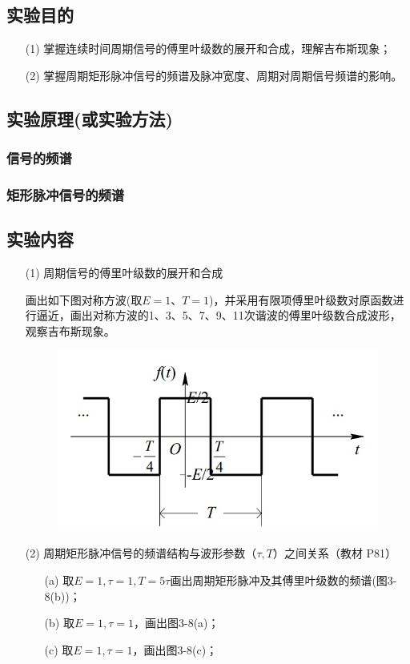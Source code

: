 \documentclass{article}
\begin{document}
	\subsection{{\heiti{}实验目的}}
	\begin{enumerate}
		\item [(1)] 掌握连续时间周期信号的傅里叶级数的展开和合成，理解吉布斯现象；
		\item [(2)] 掌握周期矩形脉冲信号的频谱及脉冲宽度、周期对周期信号频谱的影响。
	\end{enumerate}
	\subsection{{\heiti{}实验原理(或实验方法)}}
	\subsubsection{信号的频谱}
	\subsubsection{矩形脉冲信号的频谱}
	\subsection{{\heiti{}实验内容}}
	\begin{enumerate}
		\item[(1)] 周期信号的傅里叶级数的展开和合成
		
		画出如下图对称方波(取$E=1\text{、}T=1$)，并采用有限项傅里叶级数对原函数进行逼近，画出对称方波的1、3、5、7、9、11次谐波的傅里叶级数合成波形，观察吉布斯现象。
		\begin{figure}[H]
			\centering
			\includegraphics[scale=0.5]{./figures/1.jpg}
			\caption{}
		\end{figure}
		\item[(2)] 周期矩形脉冲信号的频谱结构与波形参数（$\tau,T$）之间关系（教材 P81）
		\begin{enumerate}
			\item[(a)] 取$E=1,\tau=1,T=5\tau$画出周期矩形脉冲及其傅里叶级数的频谱(图3-8(b))；
			\item[(b)] 取$E=1,\tau=1$，画出图3-8(a)；
			\item[(c)] 取$E=1,\tau=1$，画出图3-8(c)；
		\end{enumerate}
	\end{enumerate}
\end{document}
